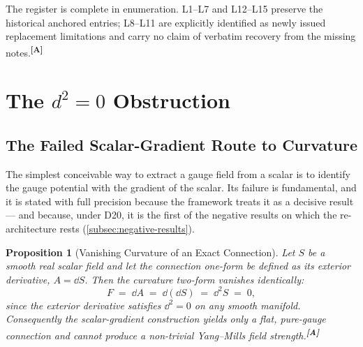 \documentclass[12pt,a4paper,twoside]{article}
\theoremstyle{plain}
\newtheorem{proposition}[theorem]{Proposition}
\theoremstyle{definition}
\theoremstyle{remark}
\newcommand{\catmark}[1]{\textsuperscript{\textsf{\textbf{[#1]}}}}
\begin{document}
\noindent The register is complete in enumeration. L1--L7 and
L12--L15 preserve the historical anchored entries; L8--L11 are explicitly
identified as newly issued replacement limitations and carry no claim of
verbatim recovery from the missing notes.\catmark{A}

\section{The \texorpdfstring{$d^2 = 0$}{d2=0} Obstruction}
\label{sec:d2-obstruction}

\subsection{The Failed Scalar-Gradient Route to Curvature}
\label{subsec:failed-scalar-gradient}

The simplest conceivable way to extract a gauge field from a scalar is
to identify the gauge potential with the gradient of the scalar. Its
failure is fundamental, and it is stated with full precision because the
framework treats it as a decisive result --- and because, under D20, it
is the first of the negative results on which the re-architecture
rests (\cref{subsec:negative-results}).

\begin{proposition}[Vanishing Curvature of an Exact Connection]
\label{prop:d2-obstruction}
Let $S$ be a smooth real scalar field and let the connection one-form be
defined as its exterior derivative, $A = \dd S$. Then the curvature
two-form vanishes identically:
\[
 F \;=\; \dd A \;=\; \dd(\dd S) \;=\; \dd^2 S \;=\; 0,
\]
since the exterior derivative satisfies $\dd^2 = 0$ on any smooth
manifold. Consequently the scalar-gradient construction yields only a
flat, pure-gauge connection and cannot produce a non-trivial Yang--Mills
field strength.\catmark{A}
\end{proposition}
\end{document}
